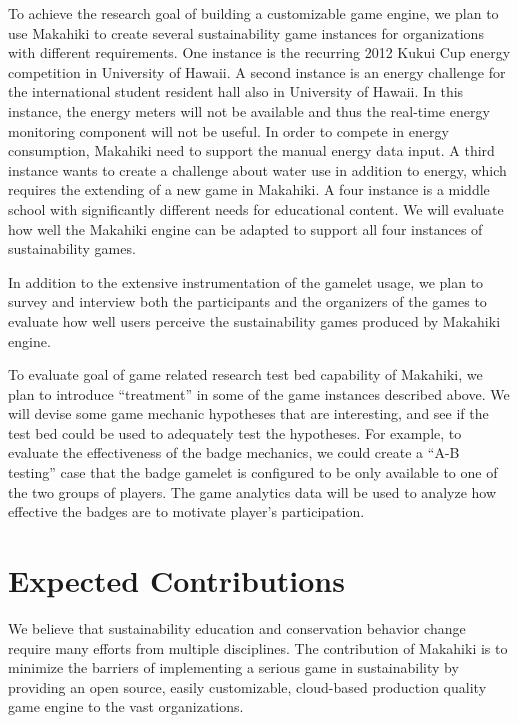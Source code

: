 \documentclass{acm_proc_article-sp}
\begin{document}
To achieve the research goal of building a customizable game engine, we plan to use Makahiki to create several sustainability game instances for organizations with different requirements. One instance is the recurring 2012 Kukui Cup energy competition in University of Hawaii. A second instance is an energy challenge for the international student resident hall also in University of Hawaii. In this instance, the energy meters will not be available and thus the real-time energy monitoring component will not be useful. In order to compete in energy consumption, Makahiki need to support the manual energy data input. A third instance wants to create a challenge about water use in addition to energy, which requires the extending of a new game in Makahiki. A four instance is a middle school with significantly different needs for educational content. We will evaluate how well the Makahiki engine can be adapted to support all four instances of sustainability games.

In addition to the extensive instrumentation of the gamelet usage, we plan to survey and interview both the participants and the organizers of the games to evaluate how well users perceive the sustainability games produced by Makahiki engine.

To evaluate goal of game related research test bed capability of Makahiki, we plan to introduce ``treatment'' in some of the game instances described above. We will devise some game mechanic hypotheses that are interesting, and see if the test bed could be used to adequately test the hypotheses. For example, to evaluate the effectiveness of the badge mechanics, we could create a ``A-B testing'' case that the badge gamelet is configured to be only available to one of the two groups of players. The game analytics data will be used to analyze how effective the badges are to motivate player's participation.

\section{Expected Contributions}


We believe that sustainability education and conservation behavior change require many efforts from multiple disciplines. The contribution of Makahiki is to minimize the barriers of implementing a serious game in sustainability by providing an open source, easily customizable, cloud-based production quality game engine to the vast organizations.
\end{document}
